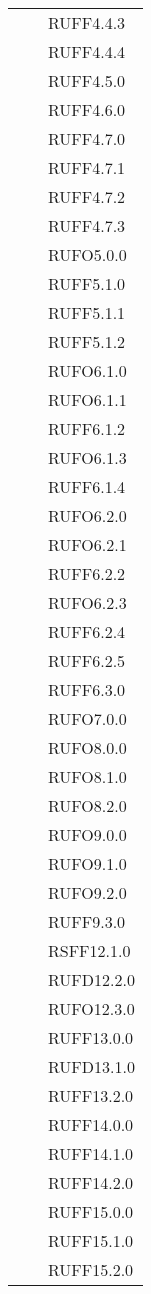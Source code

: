 \begin{center}
\begin{longtable}{lp{}l}
 &  & RUFF4.4.3 \\
 &  & RUFF4.4.4 \\
 &  & RUFF4.5.0 \\
 &  & RUFF4.6.0 \\
 &  & RUFF4.7.0 \\
 &  & RUFF4.7.1 \\
 &  & RUFF4.7.2 \\
 &  & RUFF4.7.3 \\
 &  & RUFO5.0.0 \\
 &  & RUFF5.1.0 \\
 &  & RUFF5.1.1 \\
 &  & RUFF5.1.2 \\
 &  & RUFO6.1.0 \\
 &  & RUFO6.1.1 \\
 &  & RUFF6.1.2 \\
 &  & RUFO6.1.3 \\
 &  & RUFF6.1.4 \\
 &  & RUFO6.2.0 \\
 &  & RUFO6.2.1 \\
 &  & RUFF6.2.2 \\
 &  & RUFO6.2.3 \\
 &  & RUFF6.2.4 \\
 &  & RUFF6.2.5 \\
 &  & RUFF6.3.0 \\
 &  & RUFO7.0.0 \\
 &  & RUFO8.0.0 \\
 &  & RUFO8.1.0 \\
 &  & RUFO8.2.0 \\
 &  & RUFO9.0.0 \\
 &  & RUFO9.1.0 \\
 &  & RUFO9.2.0 \\
 &  & RUFF9.3.0 \\
 &  & RSFF12.1.0 \\
 &  & RUFD12.2.0 \\
 &  & RUFO12.3.0 \\
 &  & RUFF13.0.0 \\
 &  & RUFD13.1.0 \\
 &  & RUFF13.2.0 \\
 &  & RUFF14.0.0 \\
 &  & RUFF14.1.0 \\
 &  & RUFF14.2.0 \\
 &  & RUFF15.0.0 \\
 &  & RUFF15.1.0 \\
 &  & RUFF15.2.0 \\

\end{longtable}
\end{center}
